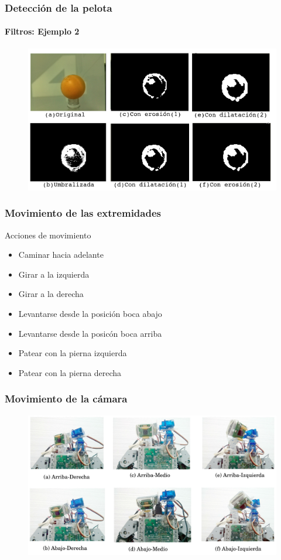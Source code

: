 \documentclass{beamer}
\begin{document}
\begin{frame}
\frametitle{Detecci\'on de la pelota}
\framesubtitle{Filtros: Ejemplo 2}

\begin{figure}[hbtp]
\centering
\includegraphics[scale=0.3]{conTodos4.png} 
\end{figure}

\end{frame}


\begin{frame}
\frametitle{Movimiento de las extremidades}

\begin{block}{Acciones de movimiento}
	\begin{itemize}
	\item Caminar hacia adelante
	\item Girar a la izquierda
	\item Girar a la derecha
	\item Levantarse desde la posici\'on boca abajo
	\item Levantarse desde la posic\'on boca arriba
	\item Patear con la pierna izquierda
	\item Patear con la pierna derecha
    \end{itemize}		
\end{block}

\end{frame}


\begin{frame}
\frametitle{Movimiento de la c\'amara}
\begin{figure}[hbtp]
\centering
\includegraphics[scale=0.09]{posicionesCamara.jpg} 
\end{figure}
\end{frame}
\end{document}
